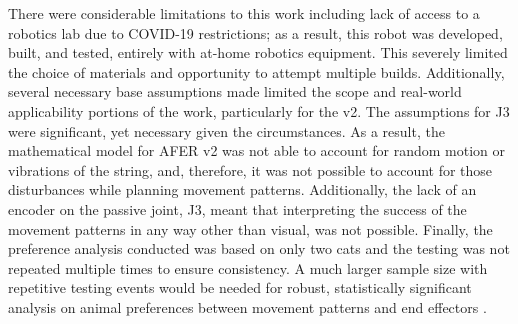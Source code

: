 There were considerable limitations to this work including lack of access to a robotics lab due to COVID-19 restrictions; as a result, this robot was developed, built, and tested, entirely with at-home robotics equipment. This severely limited the choice of materials and opportunity to attempt multiple builds. 
Additionally, several necessary base assumptions made limited the scope and real-world applicability portions of the work, particularly for the v2. The assumptions for J3 were significant, yet necessary given the circumstances. As a result, the mathematical model for AFER v2 was not able to account for random motion or vibrations of the string, and, therefore, it was not possible to account for those disturbances while planning movement patterns. Additionally, the lack of an encoder on the passive joint, J3, meant that interpreting the success of the movement patterns in any way other than visual, was not possible.
Finally, the preference analysis conducted was based on only two cats and the testing was not repeated multiple times to ensure consistency. A much larger sample size with repetitive testing events would be needed for robust, statistically significant analysis on animal preferences between movement patterns and end effectors \cite{laschi2006design}.
